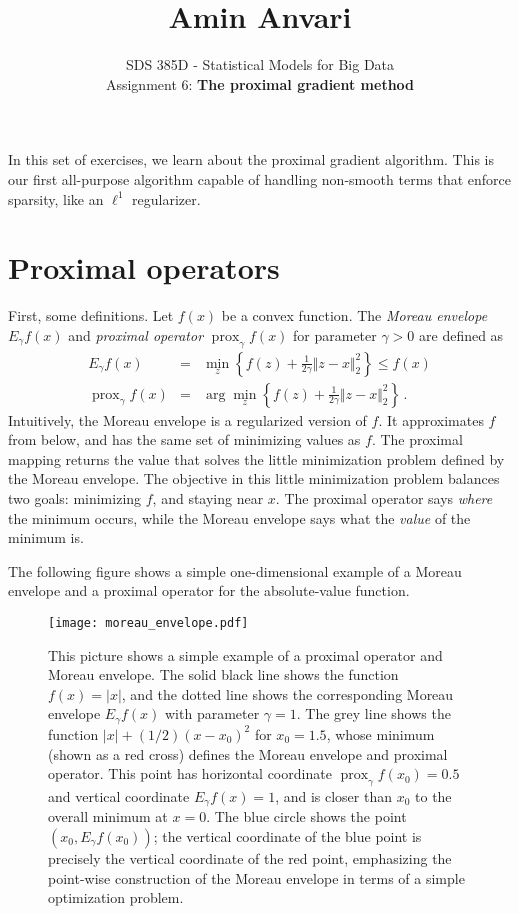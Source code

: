 \documentclass{article}
\title{Amin Anvari}
\date{}
\author{SDS 385D - Statistical Models for Big Data\\ Assignment 6: \textbf{The proximal gradient method}}
\date{}  %
\DeclareMathOperator*{\prox}{prox}
\newcommand{\enorm}[1]{\Vert #1 \Vert_2}
\begin{document}
\maketitle%

\bigskip

In this set of exercises, we learn about the proximal gradient algorithm.  This is our first all-purpose algorithm capable of handling non-smooth terms that enforce sparsity, like an $\ell^1$ regularizer.

\section{Proximal operators}

First, some definitions.  Let $f(x)$ be a convex function.  The \textit{Moreau envelope} $E_{\gamma} f(x)$ and \textit{proximal operator} $\prox_{\gamma} f(x)$ for parameter $\gamma > 0$ are defined as
\begin{eqnarray}
E_{\gamma} f(x) &=& \min_{z } \left\{f(z) + \frac{1}{2\gamma} \enorm{z - x}^2  \right\}  \leq f(x) \\
\prox_{\gamma} f(x) &=& \arg \min_{z } \left\{  f(z)+ \frac{1}{2\gamma} \enorm{z - x}^2  \right\} \, .
\end{eqnarray}
Intuitively, the Moreau envelope is a regularized version of $f$.  It approximates $f$ from below, and has the same set of minimizing values as $f$.  The proximal mapping returns the value that solves the little minimization problem defined by the Moreau envelope.  The objective in this little minimization problem balances two goals: minimizing $f$, and staying near $x$.  The proximal operator says \textit{where} the minimum occurs, while the Moreau envelope says what the \textit{value} of the minimum is.

The following figure shows a simple one-dimensional example of a Moreau envelope and a proximal operator for the absolute-value function.

\begin{figure}[!h]
\texttt{[image: moreau\_envelope.pdf]}
\caption{This picture shows a simple example of a proximal operator and Moreau envelope.  The solid black line shows the function $f(x) = |x|$, and the dotted line shows the corresponding Moreau envelope $E_{\gamma} f (x)$ with parameter $\gamma=1$.  The grey line shows the function 
  $|x| + (1/2)(x-x_0)^2$ for $x_0 = 1.5$, whose minimum (shown as a red cross)
  defines the Moreau envelope and proximal operator.  This point has horizontal coordinate
  $\prox_\gamma f(x_0) = 0.5$ and vertical coordinate $E_{\gamma} f (x) = 1$, and is closer than $x_0$
  to the overall minimum at $x=0$.  The blue circle shows the point 
  $(x_0, E_{\gamma} f (x_0))$; the vertical coordinate of the blue point is precisely the vertical coordinate of the red point, emphasizing the point-wise construction of the Moreau
  envelope in terms of a simple optimization problem.
}
\end{figure}
\end{document}
